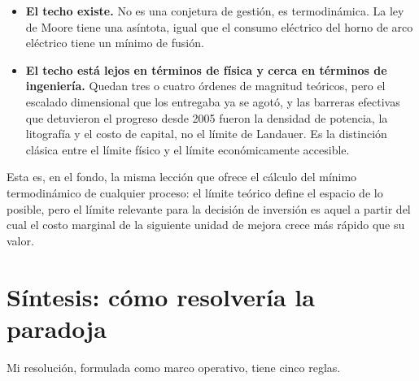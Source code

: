 \documentclass[11pt,letterpaper]{article}
\begin{document}
\begin{itemize}
  \item \textbf{El techo existe.} No es una conjetura de gestión, es
    termodinámica. La ley de Moore tiene una asíntota, igual que el consumo
    eléctrico del horno de arco eléctrico tiene un mínimo de fusión.
  \item \textbf{El techo está lejos en términos de física y cerca en términos de
    ingeniería.} Quedan tres o cuatro órdenes de magnitud teóricos, pero el
    escalado dimensional que los entregaba ya se agotó, y las barreras efectivas
    que detuvieron el progreso desde 2005 fueron la densidad de potencia, la
    litografía y el costo de capital, no el límite de Landauer. Es la distinción
    clásica entre el límite físico y el límite económicamente accesible.
\end{itemize}

Esta es, en el fondo, la misma lección que ofrece el cálculo del mínimo
termodinámico de cualquier proceso: el límite teórico define el espacio de lo
posible, pero el límite relevante para la decisión de inversión es aquel a partir
del cual el costo marginal de la siguiente unidad de mejora crece más rápido que
su valor.

\section{Síntesis: cómo resolvería la paradoja}

Mi resolución, formulada como marco operativo, tiene cinco reglas.
\end{document}
